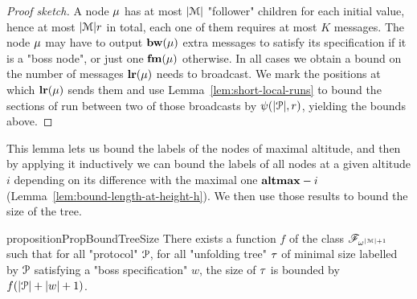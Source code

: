 \begin{proof}[Proof sketch]
	A node $\mu$ has at most $|\mathcal{M}|$ "follower" children for each initial value, hence at most $|\mathcal{M}|r$ in total, each one of them requires at most $K$ messages. The node $\mu$ may have to output $\mathbf{bw}(\mu)$ extra messages to satisfy its specification if it is a "boss node", or just one $\mathbf{fm}(\mu)$ otherwise.
	In all cases we obtain a bound on the number of messages $\mathbf{lr}(\mu)$ needs to broadcast. We mark the positions at which $\mathbf{lr}(\mu)$ sends them and use Lemma~\ref{lem:short-local-runs} to bound the sections of run between two of those broadcasts by $\psi(|\mathcal{P}|,r)$, yielding the bounds above.
\end{proof}

This lemma lets us bound the labels of the nodes of maximal altitude, and then by applying it inductively we can bound the labels of all nodes at a given altitude $i$ depending on its difference with the maximal one $\mathbf{altmax}-i$ (Lemma~\ref{lem:bound-length-at-height-h}). We then use those results to bound the size of the tree.

 
\begin{restatable}{proposition}{PropBoundTreeSize}
	\label{prop:bound-tree-size}
	There exists a function $f$ of the class $\mathscr{F}_{\omega^{|\mathcal{M}|+1}}$ such that for all "protocol" $\mathcal{P}$, for all "unfolding tree" $\tau$ of minimal size labelled by $\mathcal{P}$ satisfying a "boss specification" $w$, the size of $\tau$ is bounded by $f(|\mathcal{P}| + |w|+1)$.
\end{restatable}

